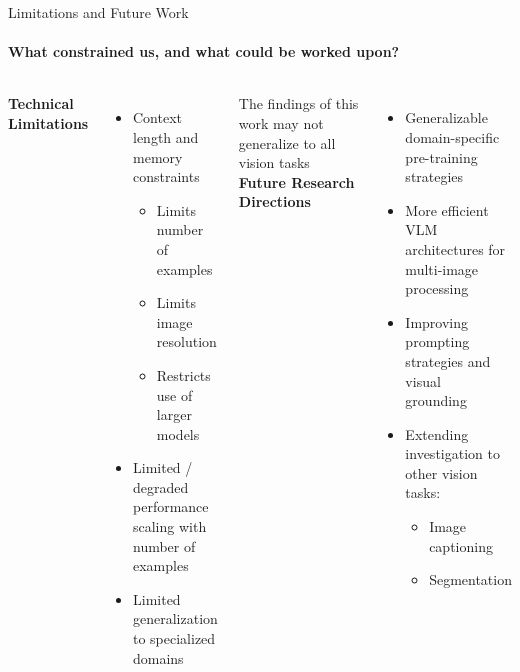 \begin{frame}{Limitations and Future Work}
\framesubtitle{What constrained us, and what could be worked upon?}
  \vspace{-1em}
  \begin{columns}[T]
    \column{\customcolumnwidth}
      \textbf{Technical Limitations}
      \begin{itemize}
        \item Context length and memory constraints
        \begin{itemize}
          \item Limits number of examples
          \item Limits image resolution
          \item Restricts use of larger models
        \end{itemize}
        \item Limited / degraded performance scaling with number of examples
        \item Limited generalization to specialized domains
      \end{itemize}
      The findings of this work may not generalize to all vision tasks
      \column{\customcolumnwidth}
      \textbf{Future Research Directions}
      \begin{itemize}
        \item Generalizable domain-specific pre-training strategies
        \item More efficient VLM architectures for multi-image processing
        \item Improving prompting strategies and visual grounding~
        \item Extending investigation to other vision tasks:
        \begin{itemize}
          \item Image captioning
          \item Segmentation
        \end{itemize}
      \end{itemize}
  \end{columns}
\end{frame}
